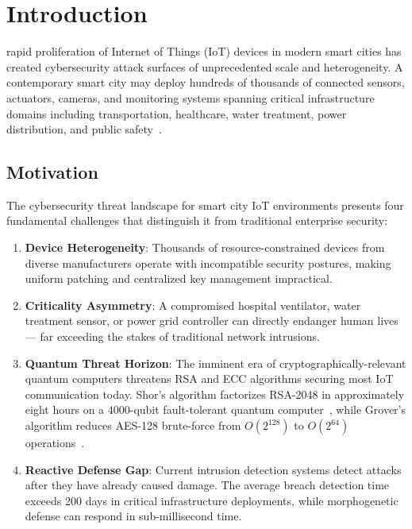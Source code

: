 
\section{Introduction}
\label{sec:intro}

 rapid proliferation of Internet of Things (IoT) devices
in modern smart cities has created cybersecurity attack surfaces of unprecedented
scale and heterogeneity. A contemporary smart city may deploy hundreds of thousands
of connected sensors, actuators, cameras, and monitoring systems spanning critical
infrastructure domains including transportation, healthcare, water treatment, power
distribution, and public safety~\cite{zanella2014iot}.

\subsection{Motivation}

The cybersecurity threat landscape for smart city IoT environments presents four
fundamental challenges that distinguish it from traditional enterprise security:

\begin{enumerate}
  \item \textbf{Device Heterogeneity}: Thousands of resource-constrained devices
        from diverse manufacturers operate with incompatible security postures,
        making uniform patching and centralized key management impractical.

  \item \textbf{Criticality Asymmetry}: A compromised hospital ventilator, water
        treatment sensor, or power grid controller can directly endanger human
        lives — far exceeding the stakes of traditional network intrusions.

  \item \textbf{Quantum Threat Horizon}: The imminent era of cryptographically-relevant
        quantum computers threatens RSA and ECC algorithms securing most IoT
        communication today. Shor's algorithm factorizes RSA-2048 in
        approximately eight hours on a 4000-qubit fault-tolerant quantum
        computer~\cite{shor1994algorithms}, while Grover's algorithm reduces
        AES-128 brute-force from $O(2^{128})$ to $O(2^{64})$ operations~\cite{grover1996search}.

  \item \textbf{Reactive Defense Gap}: Current intrusion detection systems detect
        attacks after they have already caused damage. The average breach detection
        time exceeds 200 days in critical infrastructure deployments, while
        morphogenetic defense can respond in sub-millisecond time.
\end{enumerate}

